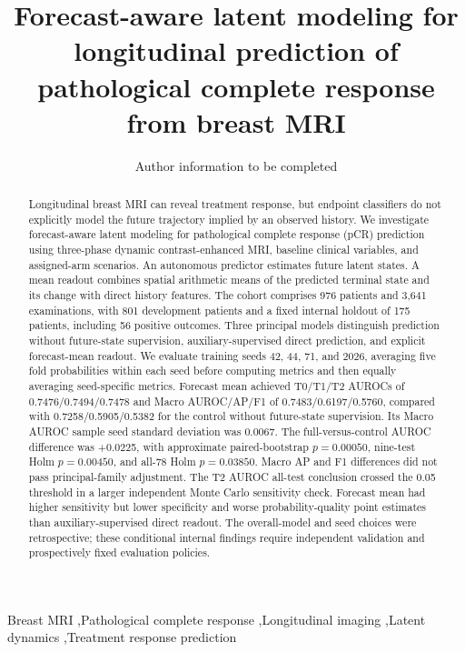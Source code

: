 \documentclass[5p,twocolumn,authoryear]{elsarticle}
\begin{document}
\begin{frontmatter}
\title{Forecast-aware latent modeling for longitudinal prediction of pathological complete response from breast MRI}
\author{Author information to be completed}
\address{Affiliations and corresponding author to be completed}
\begin{abstract}
Longitudinal breast MRI can reveal treatment response, but endpoint classifiers do not explicitly model the future trajectory implied by an observed history. We investigate forecast-aware latent modeling for pathological complete response (pCR) prediction using three-phase dynamic contrast-enhanced MRI, baseline clinical variables, and assigned-arm scenarios. An autonomous predictor estimates future latent states. A mean readout combines spatial arithmetic means of the predicted terminal state and its change with direct history features. The cohort comprises 976 patients and 3,641 examinations, with 801 development patients and a fixed internal holdout of 175 patients, including 56 positive outcomes. Three principal models distinguish prediction without future-state supervision, auxiliary-supervised direct prediction, and explicit forecast-mean readout. We evaluate training seeds 42, 44, 71, and 2026, averaging five fold probabilities within each seed before computing metrics and then equally averaging seed-specific metrics. Forecast mean achieved T0/T1/T2 AUROCs of 0.7476/0.7494/0.7478 and Macro AUROC/AP/F1 of 0.7483/0.6197/0.5760, compared with 0.7258/0.5905/0.5382 for the control without future-state supervision. Its Macro AUROC sample seed standard deviation was 0.0067. The full-versus-control AUROC difference was +0.0225, with approximate paired-bootstrap $p=0.00050$, nine-test Holm $p=0.00450$, and all-78 Holm $p=0.03850$. Macro AP and F1 differences did not pass principal-family adjustment. The T2 AUROC all-test conclusion crossed the 0.05 threshold in a larger independent Monte Carlo sensitivity check. Forecast mean had higher sensitivity but lower specificity and worse probability-quality point estimates than auxiliary-supervised direct readout. The overall-model and seed choices were retrospective; these conditional internal findings require independent validation and prospectively fixed evaluation policies.
\end{abstract}
\begin{keyword}
Breast MRI \sep Pathological complete response \sep Longitudinal imaging \sep Latent dynamics \sep Treatment response prediction
\end{keyword}
\end{frontmatter}








\end{document}
